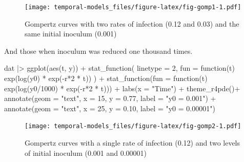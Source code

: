 \documentclass[
  letterpaper,
]{book}
\newenvironment{Shaded}{\begin{snugshade}}{\end{snugshade}}
\newcommand{\AttributeTok}[1]{\textcolor[rgb]{0.40,0.45,0.13}{#1}}
\newcommand{\ControlFlowTok}[1]{\textcolor[rgb]{0.00,0.23,0.31}{#1}}
\newcommand{\DecValTok}[1]{\textcolor[rgb]{0.68,0.00,0.00}{#1}}
\newcommand{\FloatTok}[1]{\textcolor[rgb]{0.68,0.00,0.00}{#1}}
\newcommand{\FunctionTok}[1]{\textcolor[rgb]{0.28,0.35,0.67}{#1}}
\newcommand{\NormalTok}[1]{\textcolor[rgb]{0.00,0.23,0.31}{#1}}
\newcommand{\SpecialCharTok}[1]{\textcolor[rgb]{0.37,0.37,0.37}{#1}}
\newcommand{\StringTok}[1]{\textcolor[rgb]{0.13,0.47,0.30}{#1}}
\begin{document}
\begin{figure}

{\centering \texttt{[image: temporal-models\_files/figure-latex/fig-gomp1-1.pdf]}

}

\caption{\label{fig-gomp1}Gompertz curves with two rates of infection
(0.12 and 0.03) and the same initial inoculum (0.001)}

\end{figure}

And those when inoculum was reduced one thousand times.

\begin{Shaded}
\begin{Highlighting}[]
\NormalTok{dat }\SpecialCharTok{|\textgreater{}}
  \FunctionTok{ggplot}\NormalTok{(}\FunctionTok{aes}\NormalTok{(t, y)) }\SpecialCharTok{+}
  \FunctionTok{stat\_function}\NormalTok{(}
    \AttributeTok{linetype =} \DecValTok{2}\NormalTok{,}
    \AttributeTok{fun =} \ControlFlowTok{function}\NormalTok{(t) }\FunctionTok{exp}\NormalTok{(}\FunctionTok{log}\NormalTok{(y0) }\SpecialCharTok{*} \FunctionTok{exp}\NormalTok{(}\SpecialCharTok{{-}}\NormalTok{r}\SpecialCharTok{*}\DecValTok{2} \SpecialCharTok{*}\NormalTok{ t))}
\NormalTok{  ) }\SpecialCharTok{+}
  \FunctionTok{stat\_function}\NormalTok{(}\AttributeTok{fun =} \ControlFlowTok{function}\NormalTok{(t) }\FunctionTok{exp}\NormalTok{(}\FunctionTok{log}\NormalTok{(y0}\SpecialCharTok{/}\DecValTok{1000}\NormalTok{) }\SpecialCharTok{*} \FunctionTok{exp}\NormalTok{(}\SpecialCharTok{{-}}\NormalTok{r}\SpecialCharTok{*}\DecValTok{2} \SpecialCharTok{*}\NormalTok{ t))) }\SpecialCharTok{+}
  \FunctionTok{labs}\NormalTok{(}\AttributeTok{x =} \StringTok{"Time"}\NormalTok{) }\SpecialCharTok{+}
 \FunctionTok{theme\_r4pde}\NormalTok{()}\SpecialCharTok{+}
  \FunctionTok{annotate}\NormalTok{(}\AttributeTok{geom =} \StringTok{"text"}\NormalTok{, }\AttributeTok{x =} \DecValTok{15}\NormalTok{, }\AttributeTok{y =} \FloatTok{0.77}\NormalTok{, }\AttributeTok{label =} \StringTok{"y0 = 0.001"}\NormalTok{) }\SpecialCharTok{+}
  \FunctionTok{annotate}\NormalTok{(}\AttributeTok{geom =} \StringTok{"text"}\NormalTok{, }\AttributeTok{x =} \DecValTok{25}\NormalTok{, }\AttributeTok{y =} \FloatTok{0.10}\NormalTok{, }\AttributeTok{label =} \StringTok{"y0 = 0.00001"}\NormalTok{)}
\end{Highlighting}
\end{Shaded}

\begin{figure}

{\centering \texttt{[image: temporal-models\_files/figure-latex/fig-gomp2-1.pdf]}

}

\caption{\label{fig-gomp2}Gompertz curves with a single rate of
infection (0.12) and two levels of initial inoculum (0.001 and 0.00001)}

\end{figure}
\end{document}
